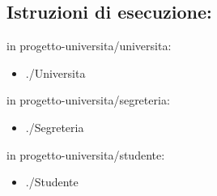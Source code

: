 \documentclass{article}
\begin{document}
\subsection{Istruzioni di esecuzione:}
in progetto-universita/universita:
\begin{itemize}
    \item ./Universita
\end{itemize}
in progetto-universita/segreteria:
\begin{itemize}
    \item ./Segreteria
\end{itemize}
in progetto-universita/studente:
\begin{itemize}
    \item ./Studente
\end{itemize}
\end{document}
